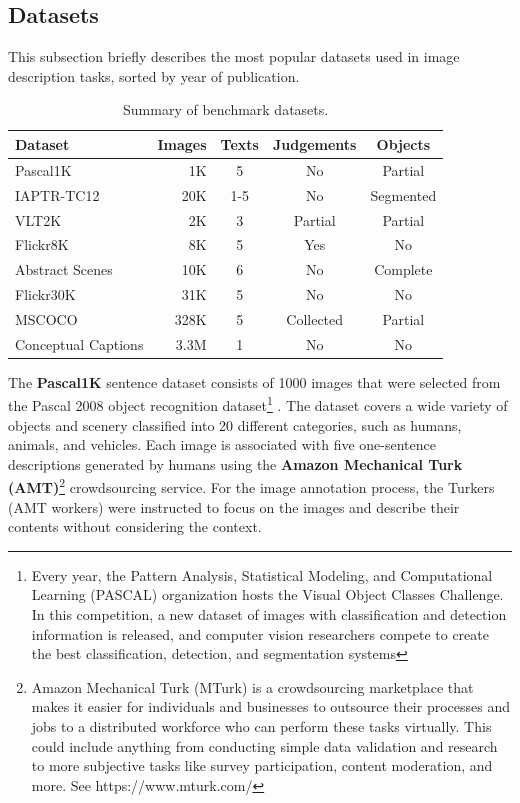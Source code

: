 \subsection{Datasets}\label{sec:datasets}

This subsection briefly describes the most popular datasets used in image description tasks, sorted by year of publication.

\begin{table}[ht]
\centering
\caption{Summary of benchmark datasets.}
\begin{tabular}[t]{lrccc}
    \toprule
    Dataset &  Images & Texts & Judgements & Objects \\
    \midrule
    Pascal1K \citep{Rashtchian2010} & 1K  & 5 & No & Partial \\
    IAPTR-TC12 \citep{Escalante2010} & 20K  & 1-5  & No & Segmented \\
    VLT2K \citep{Elliott2013} & 2K  & 3  & Partial & Partial \\
    Flickr8K \citep{Rashtchian2010} & 8K & 5 & Yes & No \\
    Abstract Scenes \citep{Zitnick2013} & 10K & 6 & No & Complete \\
    Flickr30K \citep{Young2014} & 31K  & 5 & No & No \\
    MSCOCO \citep{Lin2014} & 328K & 5 & Collected & Partial \\
    Conceptual Captions \citep{Sharma2018}  & 3.3M  & 1  & No & No \\
    \bottomrule
\end{tabular}
\label{tab:datasets}
\end{table}

The \textbf{Pascal1K} sentence dataset \citet{Rashtchian2010} consists of 1000 images that were selected from the Pascal 2008 object recognition dataset\footnote{Every year, the Pattern Analysis, Statistical Modeling, and Computational Learning (PASCAL) organization hosts the Visual Object Classes Challenge. In this competition, a new dataset of images with classification and detection information is released, and computer vision researchers compete to create the best classification, detection, and segmentation systems} \citep{Everingham2010}. The dataset covers a wide variety of objects and scenery classified into 20 different categories, such as humans, animals, and vehicles. Each image is associated with five one-sentence descriptions generated by humans using the \textbf{Amazon Mechanical Turk (AMT)}\footnote{Amazon Mechanical Turk (MTurk) is a crowdsourcing marketplace that makes it easier for individuals and businesses to outsource their processes and jobs to a distributed workforce who can perform these tasks virtually. This could include anything from conducting simple data validation and research to more subjective tasks like survey participation, content moderation, and more. See https://www.mturk.com/ \nopagebreak} crowdsourcing service. For the image annotation process, the Turkers (AMT workers) were instructed to focus on the images and describe their contents without considering the context.

